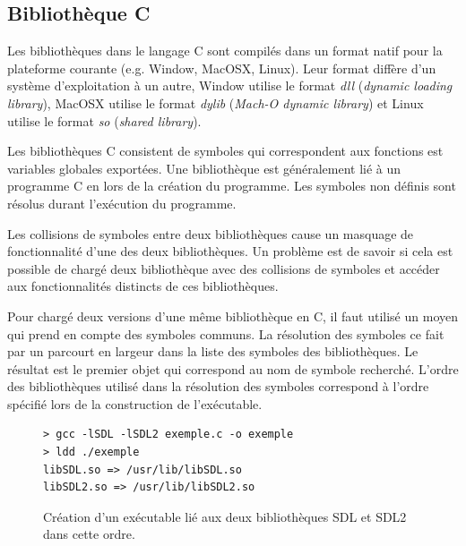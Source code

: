 

\subsection{Bibliothèque C}
%
Les bibliothèques dans le langage C sont compilés dans un format natif pour la
plateforme courante (e.g. Window, MacOSX, Linux). Leur format diffère d'un
système d'exploitation à un autre, Window utilise le format \textit{dll}
(\textit{dynamic loading library}), MacOSX utilise le format \textit{dylib}
(\textit{Mach-O dynamic library}) et Linux utilise le format \textit{so}
(\textit{shared library}).

Les bibliothèques C consistent de symboles qui correspondent aux fonctions est
variables globales exportées. Une bibliothèque est généralement lié à un
programme C en lors de la création du programme. Les symboles non définis sont
résolus durant l'exécution du programme.

Les collisions de symboles entre deux bibliothèques cause un masquage de
fonctionnalité d'une des deux bibliothèques. Un problème est de savoir si cela est
possible de chargé deux bibliothèque avec des collisions de symboles et accéder aux
fonctionnalités distincts de ces bibliothèques.

Pour chargé deux versions d'une même bibliothèque en C, il faut utilisé un
moyen qui prend en compte des symboles communs.  La résolution des symboles ce
fait par un parcourt en largeur dans la liste des symboles des bibliothèques.
Le résultat est le premier objet qui correspond au nom de symbole recherché.
L'ordre des bibliothèques utilisé dans la résolution des symboles correspond à
l'ordre spécifié lors de la construction de l'exécutable.

\begin{center}
\begin{figure}[ht]
\begin{lstlisting}[frame=single]
> gcc -lSDL -lSDL2 exemple.c -o exemple
> ldd ./exemple
libSDL.so => /usr/lib/libSDL.so
libSDL2.so => /usr/lib/libSDL2.so
\end{lstlisting}
\caption{Création d'un exécutable lié aux deux bibliothèques
SDL et SDL2 dans cette ordre.}
\label{fig:sdl_mask_sdl2}
\end{figure}
\end{center}

